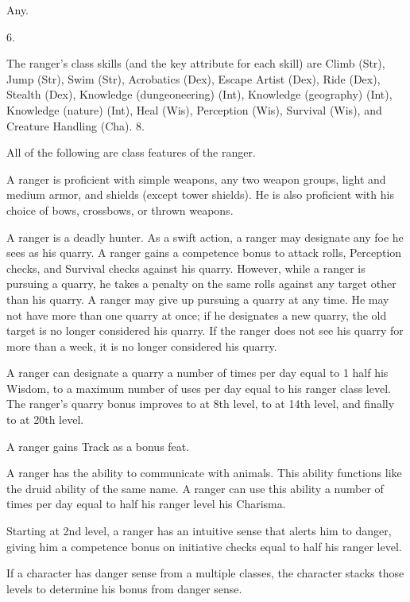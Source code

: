  Any.

 6.

The ranger's class skills (and the key attribute for each skill) are Climb (Str), Jump (Str), Swim (Str), Acrobatics (Dex), Escape Artist (Dex), Ride (Dex), Stealth (Dex), Knowledge (dungeoneering) (Int), Knowledge (geography) (Int), Knowledge (nature) (Int), Heal (Wis), Perception (Wis), Survival (Wis), and Creature Handling (Cha).
 8.


All of the following are class features of the ranger.

  A ranger is proficient with simple weapons, any two weapon groups, light and medium armor, and shields (except tower shields).   He is also proficient with his choice of bows, crossbows, or thrown weapons.

 A ranger is a deadly hunter. As a swift action, a ranger may designate any foe he sees as his quarry. A ranger gains a  competence bonus to attack rolls, Perception checks, and Survival checks against his quarry. However, while a ranger is pursuing a quarry, he takes a  penalty on the same rolls against any target other than his quarry. A ranger may give up pursuing a quarry at any time. He may not have more than one quarry at once; if he designates a new quarry, the old target is no longer considered his quarry. If the ranger does not see his quarry for more than a week, it is no longer considered his quarry.

\par A ranger can designate a quarry a number of times per day equal to 1 \add half his Wisdom, to a maximum number of uses per day equal to his ranger class level. The ranger's quarry bonus improves to  at 8th level, to  at 14th level, and finally to  at 20th level.

 A ranger gains Track as a bonus feat.

 A ranger has the ability to communicate with animals. This ability functions like the druid ability of the same name. A ranger can use this ability a number of times per day equal to half his ranger level \add his Charisma.

 Starting at 2nd level, a ranger has an intuitive sense that alerts him to danger, giving him a competence bonus on initiative checks equal to half his ranger level.
\par If a character has danger sense from a multiple classes, the character stacks those levels to determine his bonus from danger sense.

